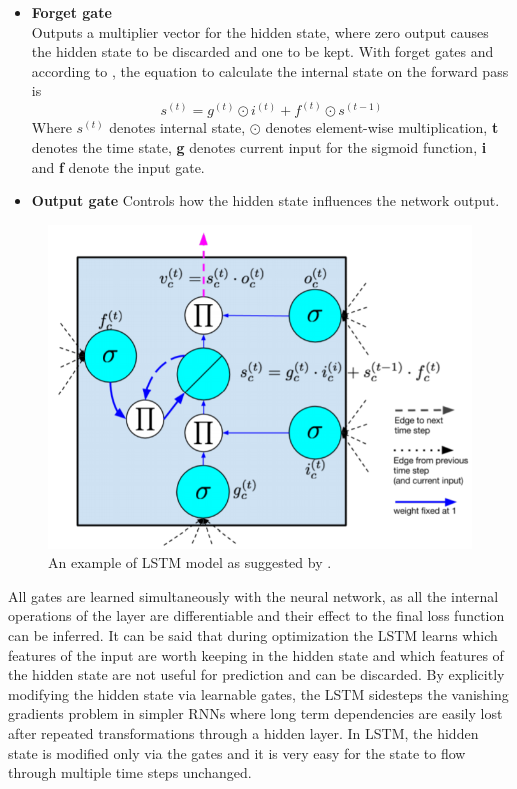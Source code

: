 \begin{itemize}
\item \textbf{Forget gate}\\
Outputs a multiplier vector for the hidden state, where zero output causes the hidden state to be discarded and one to be kept. With forget gates and according to \cite{gers1999learning}, the equation to calculate the internal state
on the forward pass is 
\begin{equation}
     s^{(t)}=g^{(t)}\odot i^{(t)}+f^{(t)}\odot s^{(t-1)}
\end{equation}
Where $s^{(t)}$ denotes internal state, $\odot$ denotes element-wise multiplication, \textbf{t} denotes the time state, \textbf{g} denotes current input for the sigmoid function, \textbf{i} and \textbf{f} denote the input gate.
\item \textbf{Output gate}
Controls how the hidden state influences the network output.
\end{itemize}

\begin{figure}[ht]
\centering
\includegraphics[width=0.80\columnwidth]{Figures/lstm}
\decoRule
\caption[An example of LSTM model as suggested by \cite{gers1999learning}.]{An example of LSTM model as suggested by \cite{gers1999learning}.}
\label{fig:lstm}
\end{figure}

All gates are learned simultaneously with the neural network, as all the
internal operations of the layer are differentiable and their effect to the final
loss function can be inferred. It can be said that during optimization the
LSTM learns which features of the input are worth keeping in the hidden
state and which features of the hidden state are not useful for prediction and
can be discarded.
By explicitly modifying the hidden state via learnable gates, the LSTM
sidesteps the vanishing gradients problem in simpler RNNs where long term
dependencies are easily lost after repeated transformations through a hidden
layer. In LSTM, the hidden state is modified only via the gates and it is very
easy for the state to flow through multiple time steps unchanged.\\

